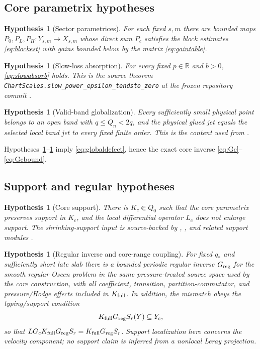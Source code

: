\documentclass[11pt]{article}
\newtheorem{hypothesis}[theorem]{Hypothesis}
\numberwithin{equation}{section}
\newcommand{\R}{\mathbb R}
\begin{document}
\subsection{Core parametrix hypotheses}
\begin{hypothesis}[Sector parametrices]\label{hyp:param}
For each fixed \(s,m\) there are bounded maps \(P_0,P_L,P_H:Y_{s,m}\to X_{s,m}\) whose direct sum \(P_c\) satisfies the block estimates \eqref{eq:blockest} with gains bounded below by the matrix \eqref{eq:gaintable}.
\end{hypothesis}

\begin{hypothesis}[Slow-loss absorption]\label{hyp:slow}
For every fixed \(p\in\R\) and \(b>0\), \eqref{eq:slowabsorb} holds.  This is the source theorem \texttt{ChartScales.\allowbreak slow\_power\_epsilon\_tendsto\_zero} at the frozen repository commit \cite{OpenAIRepo2026}.
\end{hypothesis}

\begin{hypothesis}[Valid-band globalization]\label{hyp:band}
Every sufficiently small physical point belongs to an open band with \(q\le Q_n<2q\), and the physical glued jet equals the selected local band jet to every fixed finite order.  This is the content used from  \cite{OpenAIRepo2026}.
\end{hypothesis}

Hypotheses~\ref{hyp:param}--\ref{hyp:band} imply \eqref{eq:globaldefect}, hence the exact core inverse \eqref{eq:Gc}--\eqref{eq:Gcbound}.

\subsection{Support and regular hypotheses}
\begin{hypothesis}[Core support]\label{hyp:support}
There is \(K_c\Subset Q_0\) such that the core parametrix preserves support in \(K_c\), and the local differential operator \(L_c\) does not enlarge support.  The shrinking-support input is source-backed by , , and related support modules \cite{OpenAIRepo2026}.
\end{hypothesis}

\begin{hypothesis}[Regular inverse and core-range coupling]\label{hyp:reg}
For fixed \(q_*\) and sufficiently short late slab there is a bounded periodic regular inverse \(G_{\rm reg}\) for the smooth regular Oseen problem in the same pressure-treated source space used by the core construction, with all coefficient, transition, partition-commutator, and pressure/Hodge effects included in \(K_{\rm full}\).  In addition, the mismatch obeys the typing/support condition
\[
K_{\rm full}G_{\rm reg}S_r(Y)\subseteq Y_c,
\]
so that \(LG_cK_{\rm full}G_{\rm reg}S_r=K_{\rm full}G_{\rm reg}S_r\).  Support localization here concerns the velocity component; no support claim is inferred from a nonlocal Leray projection.
\end{hypothesis}
\end{document}
